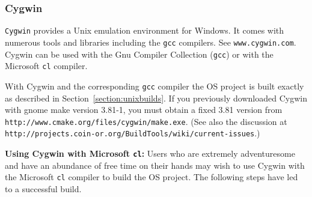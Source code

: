 \documentclass[11pt]{article}
\renewcommand{\_}{{\char"5F}}
\renewcommand{\{}{{\char"7B}}
\renewcommand{\}}{{\char"7D}}
\renewcommand{\^}{{\char"0D}}
\renewcommand{\'}{{\char"0D}}
\newcommand{\UrlCoinCygwin}{http://projects.coin-or.org/BuildTools/wiki/current-issues}
\newcommand{\UrlCygwinMake}{http://www.cmake.org/files/cygwin/make.exe}
\begin{document}
\subsubsection{Cygwin}\label{section:cygwin}

{\tt Cygwin} provides a Unix emulation environment for Windows. It comes with numerous tools and libraries including the {\tt gcc} compilers. See {\tt www.cygwin.com}.   Cygwin can be used with the Gnu Compiler Collection ({\tt gcc}) or with the Microsoft {\tt cl} compiler.

\vskip 8pt

  With Cygwin and the corresponding {\tt gcc} compiler the OS project
is built exactly as described in Section~\ref{section:unixbuilds}. If you previously downloaded Cygwin with
gnome make version 3.81-1,  you must obtain a fixed 3.81 version from {\tt\UrlCygwinMake}.
(See also
the discussion at {\tt\UrlCoinCygwin}.)


\vskip 8pt

{\bf Using Cygwin with Microsoft {\tt cl}:}   Users who are extremely adventuresome and have an abundance  of free time on their hands may wish to use Cygwin with the Microsoft {\tt cl} compiler to build the OS project.   The following steps have led to a successful build.
\end{document}
